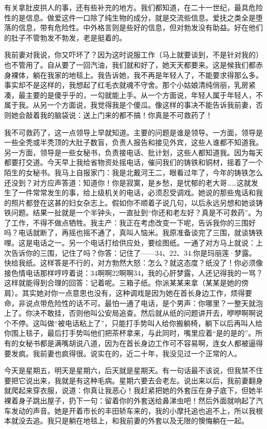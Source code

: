 有关拿肚皮拱人的事，还有些补充的地方。我们都知道，在二十一世纪，最具危险性的是信息。做爱这件一口除了纯生物的成分，就是交流些信息。爱抚之类全是堕落的信息，带有危险性。中外格言则是些好的信息，但对勃发没有助益。好在他们的肚子不管勃发不勃发，老是挺着的。 

我前妻对我说，你又吓坏了？因为这时说服工作（马上就要谈到，不是针对我的）也不管用了。自从要了一回汽油，我们就和好了，她天天都要来。这是候我们都赤身裸体，躺在我家的地毯上。我告诉她，我不再是年轻人了，不能要求得那么多。事实却不是这样的，我想起了红毛衣就魂不守舍。那个小姑娘清纯俏丽，乳房紧凑，最主要的是傻乎乎的，一勾就能上手。从一个方面说，年轻人属于年轻人，不属于我。从另一个方面说，我觉得我是个傻瓜。像这样的事决不能告诉我前妻，否则她会敲着我的脑袋说：送上门来的都不搞！你真是不可救药了！ 

我不可救药了，这一点领导上早就知道。主要的问题是谁是领导。一方面，领导是一些全秃或半秃顶的大肚子数盲，负责人报告和接见外宾，这些人谁都不知道我。另一方面，领导是一些女秘书，负责接电话、批计划，这些人都知道我。因为每天都要打交道。今天早上我给省物资处摇电话，催问我们的铸铁和铜材，摇着了一个陌生的女秘书。我马上自报家门：我是北戴河王二，眼看过年了，今年的铸铁怎么还没到？对方应声答道：知道你！你是寂寞，是乡愁，是忧郁的老大哥……这就发生了一件常常发生的事，给上级机关的电话，必须忍受调戏。她说的那些鬼话和我的照片都登在这甚的妇女杂志上。假如你不顺着子说几句，以后永远另想和她谈铸铁问题。结果一扯就是一个半钟头，一直扯到“你还和老左好？真是不可救药”。为了工作，不得不做点牺牲。我主产：我正在考虑改变一下呢，告诉我你的三围好吗？电话就断了，再摇也摇不通了，真叫人恼米。我原准备谈完了三围，就谈铸铁哩。这是电话之一。另一个电话打给供应处，要绘图纸。一通了对方马上就说：上次告诉你的三围，记住了吗？你答：记住了——34、22、34.你是玛丽莲·梦露。快给我纸。这样答是不行的，对方勃然大怒：怎么？就这态度？纸没了！你必须像接色情电话那样哼哼着说：34啊啊22啊啊34，我的心肝梦露，人还记得我的一骂？这样就能得到合理的回答：记着呢。三箱子纸。你派某某来拿（某某是她的傍肩）。其实她对你一点意思也没有，这种调戏是因为她在首长身边工作，烦得要命，非说点带危险性的话不可。最怕一通了电话，是个男声：你哪里？一整天就泡上了。你决不敢挂，否则他叫公安局追查。然后就从纸的问题讲开去，咿咿啊啊说个不停。这叫做“被电话粘上了”，只能打手势叫人给你搬躺椅，躺下以后再叫人给你围上毯子，最后打手势叫他们把茶杯拿来，与此同时，嘴里应着“是的是的”。所有的女秘书都是满嘴胡说八道，因为在首长身边工作可不容易啊，连女人都被逼得要发疯。我前妻也疯得很。说实在的，近二十年，我没见过一个正常的人。 

今天是星期五，明天是星期六，后天就是星期天。有一句话最不该说，但我禁不住要把它说出来，我就是有这种毛病。星期六要去会老左。说出来以后，我前妻翻身就爬起来穿衣服，说道：你真让我恶心！我赶紧把她的外套压在身子底下，但她半裸着身子跳出屋子，扔下一句：留着你的外套送给鼻涕虫吧！然后外面就响起了汽车发动的声音。她是开着市长的丰田轿车来的，我的小摩托追也追不上，所以我根本就没去追。我只是躺在地毯上，和我前妻的外套以及无限的懊悔躺在一起。 

